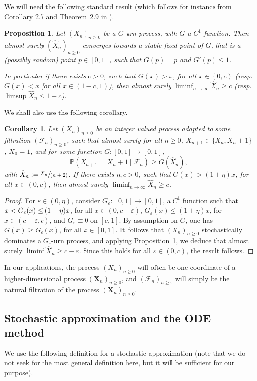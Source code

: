 \documentclass[11pt]{article}
\newcommand{\resp}{resp.\xspace}
\let\mathcal\mathscr
\newcommand{\spfrac}[2]{\sfrac{#1}{(#2)}}
\newcommand{\bX}{\boldsymbol{X}}
\numberwithin{equation}{section}
\newtheorem{corollary}[theorem]{Corollary}
\newtheorem{proposition}[theorem]{Proposition}
\theoremstyle{definition}
\begin{document}
We will need the following standard result (which follows for instance from Corollary 2.7 and Theorem~2.9 in \cite{Pemantle}).
\begin{proposition}\label{lem.urne}
Let $(X_n)_{n\ge 0}$ be a $G$-urn process, with $G$ a $C^1$-function. Then almost surely $(\hat X_n)_{n\ge 0}$ converges towards a stable fixed point
of $G$, that is a (possibly random) point $p\in [0,1]$, such that $G(p)= p$ and $G'(p)\le 1$.

In particular if there exists $c>0$, such that $G(x)>x$, for all $x\in (0,c)$ (\resp $G(x)<x$ for all $x\in (1-c,1)$),
then almost surely $\liminf_{n\to \infty} {\hat X_n}\ge c$ (\resp $\limsup {\hat X_n} \le 1-c$).
\end{proposition}
We shall also use the following corollary.
\begin{corollary}\label{prop.urne}
Let $(X_n)_{n\ge 0}$ be an integer valued process adapted to some filtration $(\mathcal F_n)_{n\ge 0}$, such that almost surely for all $n\ge 0$, $X_{n+1} \in \{X_n,X_n+1\}$, $X_0=1$, and for some function $G:[0,1]\to [0,1]$,
\begin{equation}\label{Gurn.dom}
\mathbb P(X_{n+1} = X_n +1 \mid \mathcal F_n) \ge G(\hat X_n),
\end{equation}
with $\hat X_n :=\spfrac{X_n}{n+2}$.
If there exists $\eta, c>0$, such that $G(x) > (1+\eta)x$, for all $x\in (0,c)$,
then almost surely $\liminf_{n\to \infty} {\hat X_n} \ge c$.
\end{corollary}
\begin{proof} For $\varepsilon \in (0,\eta)$, consider $G_\varepsilon:[0,1] \to [0,1]$, a $C^1$ function such that
$x <\nobreak G_\varepsilon(x) \le (1+\eta)x$, for all $x\in (0,c-\varepsilon)$, $G_\varepsilon(x) \le (1+\eta)x$, for $x\in (c-\varepsilon,c)$, and $G_\varepsilon \equiv 0$ on $[c,1]$. By assumption on $G$,
one has $G(x) \ge G_\varepsilon(x)$, for all $x\in [0,1]$. It~follows that $(X_n)_{n\ge 0}$ stochastically dominates a $G_\varepsilon$-urn process, and
applying {Proposition}~\ref{lem.urne}, we deduce that almost surely $\liminf \hat X_n \ge c-\varepsilon$.
Since this holds for all $\varepsilon \in (0,c)$, the result follows.
\end{proof}
In our applications, the process $(X_n)_{n\ge 0}$ will often be one coordinate of a higher-dimensional process $(\bX_n)_{n\ge 0}$, and
$(\mathcal F_n)_{n\ge 0}$ will simply be the natural filtration of the process $(\bX_n)_{n\ge 0}$.

\subsection{Stochastic approximation and the ODE method}\label{sec.stoch.approx}
We use the following definition for a stochastic approximation (note that we do not seek for the most general definition here, but it will be sufficient for our purpose).
\end{document}
